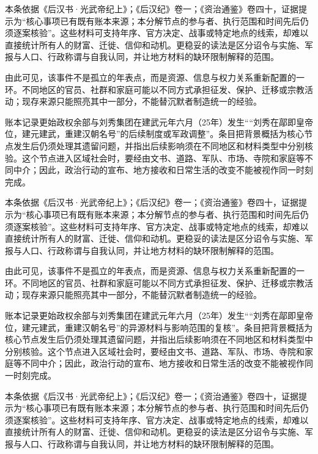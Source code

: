 本条依据《后汉书·光武帝纪上》；《后汉纪》卷一；《资治通鉴》卷四十，证据提示为“核心事项已有既有账本来源；本分解节点的参与者、执行范围和时间先后仍须逐案核验”。这些材料可支持年序、官方决定、战事或特定地点的线索，却难以直接统计所有人的财富、迁徙、信仰和动机。更稳妥的读法是区分诏令与实施、军报与人口、行政称谓与自我认同，并让地方材料的缺环限制解释的范围。

由此可见，该事件不是孤立的年表点，而是资源、信息与权力关系重新配置的一环。不同地区的官员、社群和家庭可能以不同方式承担征发、保护、迁移或宗教活动；现存来源只能照亮其中一部分，不能替沉默者制造统一的经验。

账本记录更始政权余部与刘秀集团在建武元年六月（25年）发生““刘秀在鄗即皇帝位，建元建武，重建汉朝名号”的后续制度或军政调整”。条目把背景概括为核心节点发生后仍须处理其遗留问题，并指出后续影响须在不同地区和材料类型中分别核验。这个节点进入区域社会时，要经由文书、道路、军队、市场、寺院和家庭等不同中介；因此，政治行动的宣布、地方接收和日常生活的改变不能被视作同一时刻完成。

本条依据《后汉书·光武帝纪上》；《后汉纪》卷一；《资治通鉴》卷四十，证据提示为“核心事项已有既有账本来源；本分解节点的参与者、执行范围和时间先后仍须逐案核验”。这些材料可支持年序、官方决定、战事或特定地点的线索，却难以直接统计所有人的财富、迁徙、信仰和动机。更稳妥的读法是区分诏令与实施、军报与人口、行政称谓与自我认同，并让地方材料的缺环限制解释的范围。

由此可见，该事件不是孤立的年表点，而是资源、信息与权力关系重新配置的一环。不同地区的官员、社群和家庭可能以不同方式承担征发、保护、迁移或宗教活动；现存来源只能照亮其中一部分，不能替沉默者制造统一的经验。

账本记录更始政权余部与刘秀集团在建武元年六月（25年）发生““刘秀在鄗即皇帝位，建元建武，重建汉朝名号”的异源材料与影响范围的复核”。条目把背景概括为核心节点发生后仍须处理其遗留问题，并指出后续影响须在不同地区和材料类型中分别核验。这个节点进入区域社会时，要经由文书、道路、军队、市场、寺院和家庭等不同中介；因此，政治行动的宣布、地方接收和日常生活的改变不能被视作同一时刻完成。

本条依据《后汉书·光武帝纪上》；《后汉纪》卷一；《资治通鉴》卷四十，证据提示为“核心事项已有既有账本来源；本分解节点的参与者、执行范围和时间先后仍须逐案核验”。这些材料可支持年序、官方决定、战事或特定地点的线索，却难以直接统计所有人的财富、迁徙、信仰和动机。更稳妥的读法是区分诏令与实施、军报与人口、行政称谓与自我认同，并让地方材料的缺环限制解释的范围。

